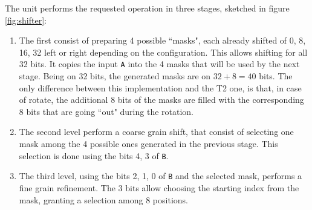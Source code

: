  The unit performs the requested operation in three stages, sketched in figure \ref{fig:shifter}:
\begin{enumerate}
    \item The first consist of preparing 4 possible ``masks", each already shifted of {0, 8, 16, 32} left or right depending on the configuration. This allows shifting for all 32 bits. It copies the input \texttt{A} into the 4 masks that will be used by the next stage. Being on 32 bits, the generated masks are on $32+8=40$ bits. The only difference between this implementation and the T2 one, is that, in case of rotate, the additional 8 bits of the masks are filled with the corresponding 8 bits that are going ``out" during the rotation.
    \item The second level perform a coarse grain shift, that consist of selecting one mask among the 4 possible ones generated in the previous stage. This selection is done using the bits {4, 3} of \texttt{B}.
    \item The third level, using the bits {2, 1, 0} of \texttt{B} and the selected mask, performs a fine grain refinement. The 3 bits allow choosing the starting index from the mask, granting a selection among 8 positions.
\end{enumerate}



